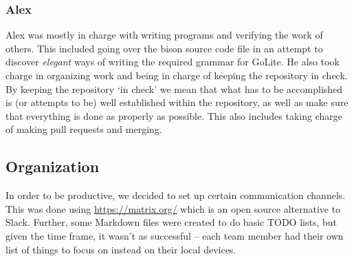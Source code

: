 \documentclass{article}
\begin{document}
\subsubsection{Alex}


Alex was mostly in charge with writing programs and verifying the work of
others. This included going over the bison source code file in an attempt to discover
\textit{elegant} ways of writing the required grammar for GoLite. He also took
charge in organizing work and being in charge of keeping the repository in check.
By keeping the repository `in check' we mean that what has to be accomplished is
(or attempts to be) well established within the repository, as well as make sure
that everything is done as properly as possible. This also includes taking charge of making pull requests and merging.


\subsection{Organization}


In order to be productive, we decided to set up certain communication channels.
This was done using \href{Matrix}{https://matrix.org/} which is an open source
alternative to Slack. Further, some Markdown files were created to do basic
TODO lists, but given the time frame, it wasn't as successful -- each team
member had their own list of things to focus on instead on their local devices.

%
\end{document}
